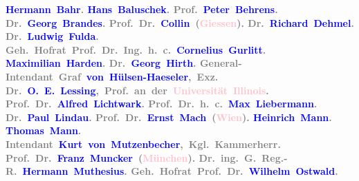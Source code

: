            \centering{}\textcolor{gray}{\textbf{\textbf{\textcolor{blue}{Hermann Bahr}{}\ledrightnote{\textcolor{blue}{Hermann Bahr}}. \textcolor{blue}{Hans Baluschek}{}\ledrightnote{\textcolor{blue}{Hans Baluschek}}. Prof. \textcolor{blue}{Peter Behrens}{}\ledrightnote{\textcolor{blue}{Peter Behrens}}.}{ }\textbf{Dr. \textcolor{blue}{Georg Brandes}{}\ledrightnote{\textcolor{blue}{Georg Brandes}}.
                                Prof. Dr. \textcolor{blue}{Collin}{}\ledrightnote{\textcolor{blue}{Josef Collin}}} (\textcolor{pink}{Giessen}{}\ledrightnote{\textcolor{pink}{Gießen}})\textbf{.}{ }\textbf{Dr. \textcolor{blue}{Richard Dehmel}{}\ledrightnote{\textcolor{blue}{Richard Dehmel}}.
                                Dr. \textcolor{blue}{Ludwig Fulda}{}\ledrightnote{\textcolor{blue}{Ludwig Fulda}}.}{ }Geh. Hofrat \textbf{Prof. Dr. Ing. h. c. \textcolor{blue}{Cornelius Gurlitt}{}\ledrightnote{\textcolor{blue}{Cornelius Gurlitt}}. \textcolor{blue}{Maximilian Harden}{}\ledrightnote{\textcolor{blue}{Maximilian Harden}}. Dr. \textcolor{blue}{Georg Hirth}{}\ledrightnote{\textcolor{blue}{Georg Hirth}}.} General-Intendant \textbf{Graf \textcolor{blue}{von Hülsen-Haeseler}{}\ledrightnote{\textcolor{blue}{Georg von Hülsen-Haeseler}},} Exz\textbf{.}{ }\textbf{Dr. \textcolor{blue}{O. E. Lessing}{}\ledrightnote{\textcolor{blue}{Otto Eduard Lessing}}, Prof.} an der \textcolor{pink}{Universität Illinois}{}\ledrightnote{\textcolor{pink}{University of Illinois}}\textbf{. Prof. Dr. \textcolor{blue}{Alfred Lichtwark}{}\ledrightnote{\textcolor{blue}{Alfred Lichtwark}}. Prof. Dr. h. c. \textcolor{blue}{Max Liebermann}{}\ledrightnote{\textcolor{blue}{Max Liebermann}}. Dr. \textcolor{blue}{Paul Lindau}{}\ledrightnote{\textcolor{blue}{Paul Lindau}}. Prof. Dr. \textcolor{blue}{Ernst Mach}{}\ledrightnote{\textcolor{blue}{Ernst Mach}}} (\textcolor{pink}{Wien}{}\ledrightnote{\textcolor{pink}{Wien}})\textbf{. \textcolor{blue}{Heinrich Mann}{}\ledrightnote{\textcolor{blue}{Heinrich Mann}}.}{ }\textbf{\textcolor{blue}{Thomas Mann}{}\ledrightnote{\textcolor{blue}{Thomas Mann}}.} Intendant \textbf{\textcolor{blue}{Kurt von Mutzenbecher}{}\ledrightnote{\textcolor{blue}{Kurt von Mutzenbecher}}, }Kgl. Kammerherr\textbf{.
                                Prof. Dr. \textcolor{blue}{Franz Muncker}{}\ledrightnote{\textcolor{blue}{Franz Muncker}}} (\textcolor{pink}{München}{}\ledrightnote{\textcolor{pink}{München}})\textbf{.
                                Dr. ing. G. Reg.-R. \textcolor{blue}{Hermann Muthesius}{}\ledrightnote{\textcolor{blue}{Hermann Muthesius}}.} Geh. Hofrat \textbf{Prof. Dr. \textcolor{blue}{Wilhelm Ostwald}{}\ledrightnote{\textcolor{blue}{Wilhelm Ostwald}}.}
}}
